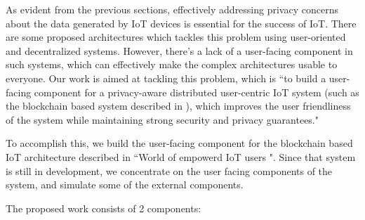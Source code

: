 As evident from the previous sections, effectively addressing privacy concerns about the data generated by IoT devices is essential for the success of IoT. There are some proposed architectures which tackles this problem using user-oriented and decentralized systems. However, there's a lack of a user-facing component in such systems, which can effectively make the complex architectures usable to everyone. Our work is aimed at tackling this problem, which is ``to build a user-facing component for a privacy-aware distributed user-centric IoT system (such as the blockchain based system described in \cite{campbell}), which improves the user friendliness of the system while maintaining strong security and privacy guarantees."

To accomplish this, we build the user-facing component for the blockchain based IoT architecture described in ``World of empowerd IoT users \cite{campbell}". Since that system is still in development, we concentrate on the user facing components of the system, and simulate some of the external components.

The proposed work consists of 2 components:

